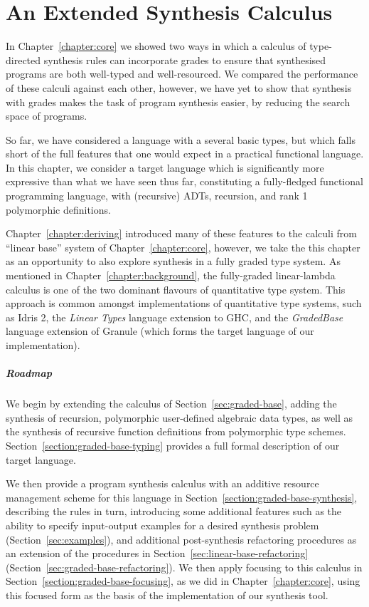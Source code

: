 \chapter{An Extended Synthesis Calculus}
\label{chapter:extended}
In Chapter~\ref{chapter:core} we showed two ways in which a calculus of
type-directed synthesis rules can incorporate grades to ensure that synthesised
programs are both well-typed and well-resourced. We compared the performance of
these calculi against each other, however, we have yet to show that synthesis
with grades makes the task of program synthesis easier, by reducing the search
space of programs. 

So far, we have considered a language with a several basic types, but which
falls short of the full features that one would expect in a practical functional
language. In this chapter, we consider a target language which is significantly
more expressive than what we have seen thus far, constituting a fully-fledged
functional programming language, with (recursive) ADTs, recursion, and rank 1
polymorphic definitions. 

Chapter~\ref{chapter:deriving} introduced many of these features to the calculi
from ``linear base'' system of Chapter~\ref{chapter:core}, however, we take the
this chapter as an opportunity to also explore synthesis in a fully graded type
system. As mentioned in Chapter~\ref{chapter:background}, the fully-graded
linear-lambda calculus is one of the two dominant flavours of quantitative type
system. This approach is common amongst implementations of quantitative type
systems, such as Idris 2, the \emph{Linear Types} language extension to GHC, and
the \emph{GradedBase} language extension of Granule (which forms the target
language of our implementation). 

\paragraph{Roadmap}
We begin by extending the calculus of Section~\ref{sec:graded-base}, adding the
synthesis of recursion, polymorphic user-defined algebraic data types, as well
as the synthesis of recursive function definitions from polymorphic type
schemes. Section~\ref{section:graded-base-typing} provides a full formal description 
of our target language.

We then provide a program synthesis calculus with an additive resource
management scheme for this language in
Section~\ref{section:graded-base-synthesis}, describing the rules in turn,
introducing some additional features such as the ability to specify input-output
examples for a desired synthesis problem (Section~\ref{sec:examples}), and
additional post-synthesis refactoring procedures as an extension of the
procedures in Section~\ref{sec:linear-base-refactoring}
(Section~\ref{sec:graded-base-refactoring}). We then apply focusing to this
calculus in Section~\ref{section:graded-base-focusing}, as we did in
Chapter~\ref{chapter:core}, using this focused form as the basis of the
implementation of our synthesis tool.

